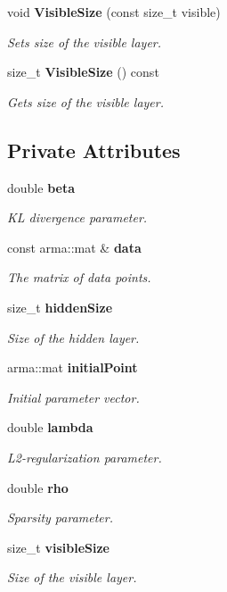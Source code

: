 \begin{DoxyCompactItemize}
void {\bf Visible\+Size} (const size\+\_\+t visible)
\begin{DoxyCompactList}\small\item\em Sets size of the visible layer. \end{DoxyCompactList}\item 
size\+\_\+t {\bf Visible\+Size} () const 
\begin{DoxyCompactList}\small\item\em Gets size of the visible layer. \end{DoxyCompactList}\end{DoxyCompactItemize}
\subsection*{Private Attributes}
\begin{DoxyCompactItemize}
\item 
double {\bf beta}
\begin{DoxyCompactList}\small\item\em KL divergence parameter. \end{DoxyCompactList}\item 
const arma\+::mat \& {\bf data}
\begin{DoxyCompactList}\small\item\em The matrix of data points. \end{DoxyCompactList}\item 
size\+\_\+t {\bf hidden\+Size}
\begin{DoxyCompactList}\small\item\em Size of the hidden layer. \end{DoxyCompactList}\item 
arma\+::mat {\bf initial\+Point}
\begin{DoxyCompactList}\small\item\em Initial parameter vector. \end{DoxyCompactList}\item 
double {\bf lambda}
\begin{DoxyCompactList}\small\item\em L2-\/regularization parameter. \end{DoxyCompactList}\item 
double {\bf rho}
\begin{DoxyCompactList}\small\item\em Sparsity parameter. \end{DoxyCompactList}\item 
size\+\_\+t {\bf visible\+Size}
\begin{DoxyCompactList}\small\item\em Size of the visible layer. \end{DoxyCompactList}\end{DoxyCompactItemize}


